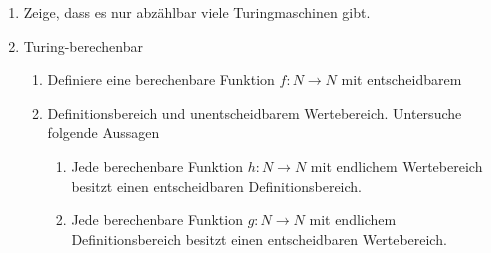 \documentclass{lehramt-informatik-aufgabe}
\begin{document}
\begin{enumerate}
\item Zeige, dass es nur abzählbar viele Turingmaschinen gibt.

\item Turing-berechenbar

\begin{enumerate}
\item Definiere eine berechenbare Funktion $f: N \rightarrow N$ mit
entscheidbarem

\item Definitionsbereich und unentscheidbarem Wertebereich. Untersuche
folgende Aussagen

\begin{enumerate}

\item Jede berechenbare Funktion $h: N \rightarrow N$ mit endlichem
Wertebereich besitzt einen entscheidbaren Definitionsbereich.

\item Jede berechenbare Funktion $g: N \rightarrow N$ mit endlichem
Definitionsbereich besitzt einen entscheidbaren Wertebereich.
\end{enumerate}
\end{enumerate}
\end{enumerate}
\end{document}
